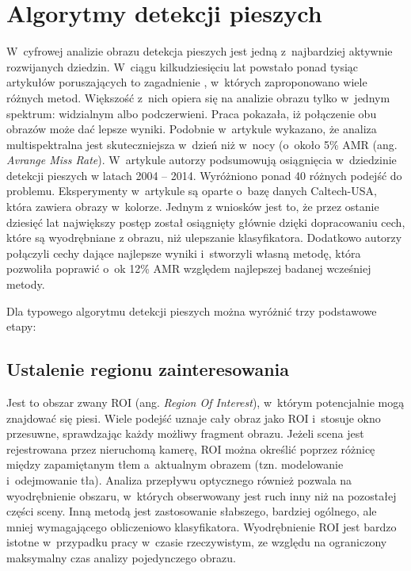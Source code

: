 \chapter{Algorytmy detekcji pieszych}
\label{cha:algoDetPiesz}

W~cyfrowej analizie obrazu detekcja pieszych jest jedną z~najbardziej aktywnie rozwijanych dziedzin.
W~ciągu kilkudziesięciu lat powstało ponad tysiąc artykułów poruszających to zagadnienie \cite{zhang2015filtered}, w~których zaproponowano wiele różnych metod.
Większość z~nich opiera się na analizie obrazu tylko w~jednym spektrum: widzialnym albo podczerwieni.
Praca \cite{hwang2015multispectral} pokazała, iż połączenie obu obrazów może dać lepsze wyniki.
Podobnie w~artykule \cite{gonzalez2016pedestrian} wykazano, że analiza multispektralna jest skuteczniejsza w~dzień niż w~nocy (o~około 5\% AMR (ang. \textit{Avrange Miss Rate}).
W~artykule \cite{benenson2014ten} autorzy podsumowują osiągnięcia w~dziedzinie detekcji pieszych w latach 2004 -- 2014.
Wyróżniono ponad 40 różnych podejść do problemu.
Eksperymenty w~artykule są oparte o~bazę danych Caltech-USA, która zawiera obrazy w~kolorze.
Jednym z wniosków jest to, że przez ostanie dziesięć lat największy postęp został osiągnięty głównie dzięki dopracowaniu cech, które są wyodrębniane z obrazu, niż ulepszanie klasyfikatora.
Dodatkowo autorzy połączyli cechy dające najlepsze wyniki i~stworzyli własną metodę, która pozwoliła poprawić o~ok 12\% AMR względem najlepszej badanej wcześniej metody.


Dla typowego algorytmu detekcji pieszych można wyróżnić trzy podstawowe etapy:

\section{Ustalenie regionu zainteresowania}

Jest to obszar zwany ROI (ang. \textit{Region Of Interest}), w~którym potencjalnie mogą znajdować się piesi.
Wiele podejść uznaje cały obraz jako ROI i~stosuje okno przesuwne, sprawdzając każdy możliwy fragment obrazu.
Jeżeli scena jest rejestrowana przez nieruchomą kamerę, ROI można określić poprzez różnicę między zapamiętanym tłem a~aktualnym obrazem (tzn. modelowanie i~odejmowanie tła). 
Analiza przepływu optycznego również pozwala na wyodrębnienie obszaru, w~których obserwowany jest ruch inny niż na pozostałej części sceny. 
Inną metodą jest zastosowanie słabszego, bardziej ogólnego, ale mniej wymagającego obliczeniowo  klasyfikatora.
Wyodrębnienie ROI jest bardzo istotne w~przypadku pracy w~czasie rzeczywistym, ze względu na ograniczony maksymalny czas analizy pojedynczego obrazu.


